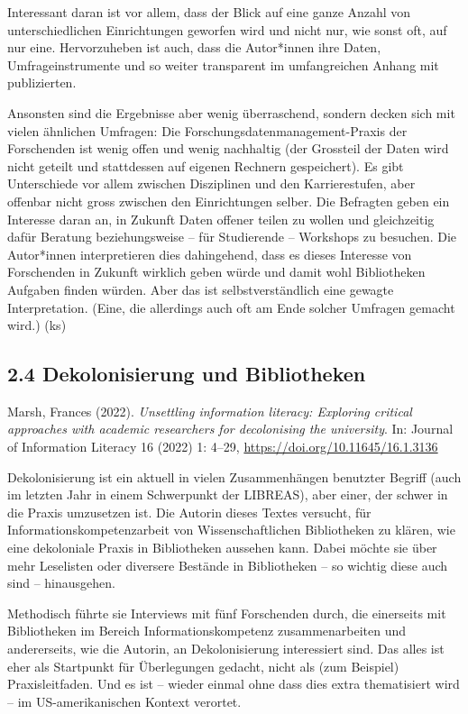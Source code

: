 \documentclass[a4paper,
fontsize=11pt,
oneside,
numbers=noperiodatend,
parskip=half-,
bibliography=totoc,
final
]{scrartcl}
\begin{document}
Interessant daran ist vor allem, dass der Blick auf eine ganze Anzahl
von unterschiedlichen Einrichtungen geworfen wird und nicht nur, wie
sonst oft, auf nur eine. Hervorzuheben ist auch, dass die Autor*innen
ihre Daten, Umfrageinstrumente und so weiter transparent im
umfangreichen Anhang mit publizierten.

Ansonsten sind die Ergebnisse aber wenig überraschend, sondern decken
sich mit vielen ähnlichen Umfragen: Die Forschungsdatenmanagement-Praxis
der Forschenden ist wenig offen und wenig nachhaltig (der Grossteil der
Daten wird nicht geteilt und stattdessen auf eigenen Rechnern
gespeichert). Es gibt Unterschiede vor allem zwischen Disziplinen und
den Karrierestufen, aber offenbar nicht gross zwischen den Einrichtungen
selber. Die Befragten geben ein Interesse daran an, in Zukunft Daten
offener teilen zu wollen und gleichzeitig dafür Beratung beziehungsweise
-- für Studierende -- Workshops zu besuchen. Die Autor*innen
interpretieren dies dahingehend, dass es dieses Interesse von
Forschenden in Zukunft wirklich geben würde und damit wohl Bibliotheken
Aufgaben finden würden. Aber das ist selbstverständlich eine gewagte
Interpretation. (Eine, die allerdings auch oft am Ende solcher Umfragen
gemacht wird.) (ks)

\hypertarget{dekolonisierung-und-bibliotheken}{%
\subsection{2.4 Dekolonisierung und
Bibliotheken}\label{dekolonisierung-und-bibliotheken}}

Marsh, Frances (2022). \emph{Unsettling information literacy: Exploring
critical approaches with academic researchers for decolonising the
university}. In: Journal of Information Literacy 16 (2022) 1: 4--29,
\url{https://doi.org/10.11645/16.1.3136}

Dekolonisierung ist ein aktuell in vielen Zusammenhängen benutzter
Begriff (auch im letzten Jahr in einem Schwerpunkt der LIBREAS), aber
einer, der schwer in die Praxis umzusetzen ist. Die Autorin dieses
Textes versucht, für Informationskompetenzarbeit von Wissenschaftlichen
Bibliotheken zu klären, wie eine dekoloniale Praxis in Bibliotheken
aussehen kann. Dabei möchte sie über mehr Leselisten oder diversere
Bestände in Bibliotheken -- so wichtig diese auch sind -- hinausgehen.

Methodisch führte sie Interviews mit fünf Forschenden durch, die
einerseits mit Bibliotheken im Bereich Informationskompetenz
zusammenarbeiten und andererseits, wie die Autorin, an Dekolonisierung
interessiert sind. Das alles ist eher als Startpunkt für Überlegungen
gedacht, nicht als (zum Beispiel) Praxisleitfaden. Und es ist -- wieder
einmal ohne dass dies extra thematisiert wird -- im US-amerikanischen
Kontext verortet.
\end{document}
